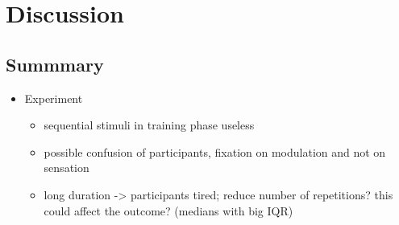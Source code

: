 \documentclass[../main.tex]{subfiles}
\begin{document}
\chapter{Discussion}

\iffalse

\section{Summmary}

\begin{itemize}
  \item Experiment
  \begin{itemize}
    \item sequential stimuli in training phase useless
    \item possible confusion of participants, fixation on modulation and not
      on sensation
    \item long duration -> participants tired; reduce number of repetitions?
      this could affect the outcome? (medians with big IQR)


\end{itemize}
\end{itemize}
\end{document}
